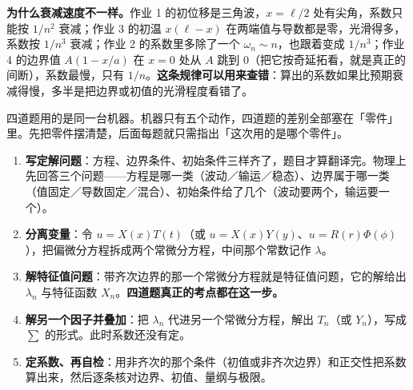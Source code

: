 \documentclass[11pt]{ctexart}
\let\origsubhdr\subhdr
\renewcommand{\subhdr}[1]{\par\needspace{3\baselineskip}\origsubhdr{#1}}
\let\orighdr\hdr
\renewcommand{\hdr}[2]{\par\needspace{7\baselineskip}\orighdr{#1}{#2}}
\begin{document}
\textbf{为什么衰减速度不一样。}作业 1 的初位移是三角波，$x=\ell/2$ 处有尖角，系数只能按 $1/n^2$ 衰减；作业 3 的初温 $x(\ell-x)$ 在两端值与导数都是零，光滑得多，系数按 $1/n^3$ 衰减；作业 2 的系数里多除了一个 $\omega_n\sim n$，也跟着变成 $1/n^3$；作业 4 的边界值 $A(1-x/a)$ 在 $x=0$ 处从 $A$ 跳到 $0$（把它按奇延拓看，就是真正的间断），系数最慢，只有 $1/n$。\textbf{这条规律可以用来查错}：算出的系数如果比预期衰减得慢，多半是把边界或初值的光滑程度看错了。

\label{sec:s1}

四道题用的是同一台机器。机器只有五个动作，四道题的差别全部塞在「零件」里。先把零件摆清楚，后面每题就只需指出「这次用的是哪个零件」。


\begin{enumerate}[label=\textbf{(\arabic*)}]
  \item \textbf{写定解问题}：方程、边界条件、初始条件三样齐了，题目才算翻译完。物理上先回答三个问题——方程是哪一类（波动／输运／稳态）、边界属于哪一类（值固定／导数固定／混合）、初始条件给了几个（波动要两个，输运要一个）。
  \item \textbf{分离变量}：令 $u=X(x)T(t)$（或 $u=X(x)Y(y)$、$u=R(r)\Phi(\phi)$），把偏微分方程拆成两个常微分方程，中间那个常数记作 $\lambda$。
  \item \textbf{解特征值问题}：带齐次边界的那一个常微分方程就是特征值问题，它的解给出 $\lambda_n$ 与特征函数 $X_n$。\textbf{四道题真正的考点都在这一步。}
  \item \textbf{解另一个因子并叠加}：把 $\lambda_n$ 代进另一个常微分方程，解出 $T_n$（或 $Y_n$），写成 $\sum$ 的形式。此时系数还没有定。
  \item \textbf{定系数、再自检}：用非齐次的那个条件（初值或非齐次边界）和正交性把系数算出来，然后逐条核对边界、初值、量纲与极限。
\end{enumerate}

\end{document}

